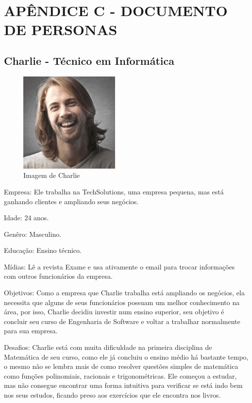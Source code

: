 \chapter*{APÊNDICE C - DOCUMENTO DE PERSONAS}\label{apendice_personas}

\section{Charlie - Técnico em Informática}

\begin{figure}[H]
\centering
\includegraphics[width=5cm]{figuras/personas/figura_persona_1}
\caption{Imagem de Charlie}
\label{figura_persona_1}
\end{figure}


Empresa: Ele trabalha na TechSolutions, uma empresa pequena, mas está ganhando
clientes e ampliando seus negócios.

Idade: 24 anos.

Genêro: Masculino.

Educação: Ensino técnico.

Mídias: Lê a revista Exame e usa ativamente o email para trocar informações com 
outros funcionários da empresa.

Objetivos: Como a empresa que Charlie trabalha está ampliando os negócios, ela
necessita que alguns de seus funcionários possuam um melhor conhecimento na 
área, por isso, Charlie decidiu investir num ensino superior, seu objetivo é 
concluir seu curso de Engenharia de Software e voltar a trabalhar normalmente 
para sua empresa.

Desafios: Charlie está com muita dificuldade na primeira disciplina de 
Matemática de seu curso, como ele já concluiu o ensino médio há bastante tempo, 
o mesmo não se lembra mais de como resolver questões simples de matemática como 
funções polinomiais, racionais e trigonométricas. Ele começou a estudar, mas 
não consegue encontrar uma forma intuitiva para verificar se está indo bem nos 
seus estudos, ficando preso aos exercícios que ele encontra nos livros.

